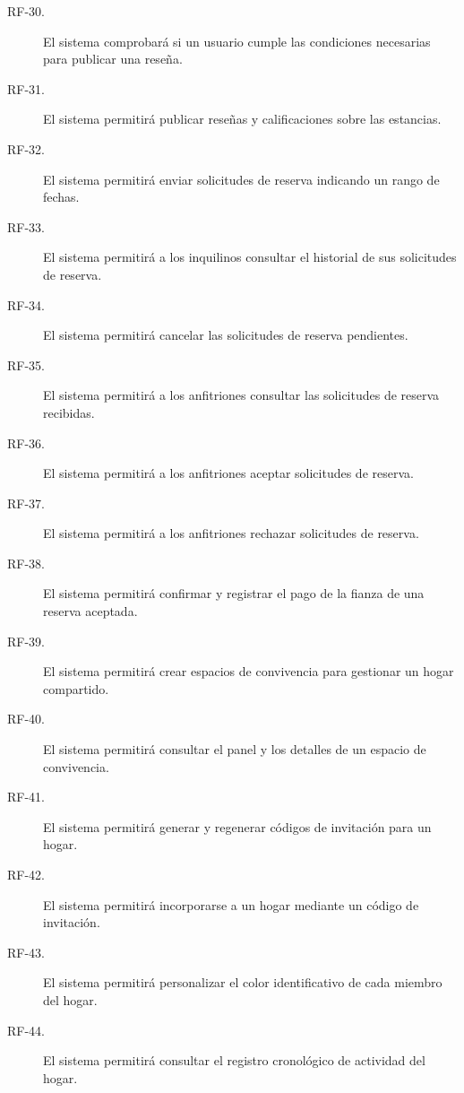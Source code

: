 \begin{description}
    \item[RF-30.] El sistema comprobará si un usuario cumple las condiciones necesarias para publicar una reseña.

    \item[RF-31.] El sistema permitirá publicar reseñas y calificaciones sobre las estancias.

    \item[RF-32.] El sistema permitirá enviar solicitudes de reserva indicando un rango de fechas.

    \item[RF-33.] El sistema permitirá a los inquilinos consultar el historial de sus solicitudes de reserva.

    \item[RF-34.] El sistema permitirá cancelar las solicitudes de reserva pendientes.

    \item[RF-35.] El sistema permitirá a los anfitriones consultar las solicitudes de reserva recibidas.

    \item[RF-36.] El sistema permitirá a los anfitriones aceptar solicitudes de reserva.

    \item[RF-37.] El sistema permitirá a los anfitriones rechazar solicitudes de reserva.

    \item[RF-38.] El sistema permitirá confirmar y registrar el pago de la fianza de una reserva aceptada.

    \item[RF-39.] El sistema permitirá crear espacios de convivencia para gestionar un hogar compartido.

    \item[RF-40.] El sistema permitirá consultar el panel y los detalles de un espacio de convivencia.

    \item[RF-41.] El sistema permitirá generar y regenerar códigos de invitación para un hogar.

    \item[RF-42.] El sistema permitirá incorporarse a un hogar mediante un código de invitación.

    \item[RF-43.] El sistema permitirá personalizar el color identificativo de cada miembro del hogar.

    \item[RF-44.] El sistema permitirá consultar el registro cronológico de actividad del hogar.


\end{description}
